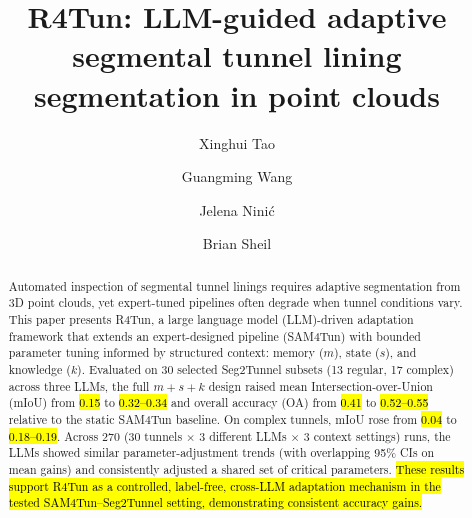 \documentclass[a4paper,fleqn]{cas-dc}
\begin{document}
\let\WriteBookmarks\relax
\def\floatpagepagefraction{1}
\def\textpagefraction{.001}




{

\title[mode=title]{R4Tun: LLM-guided adaptive segmental tunnel lining segmentation in point clouds}

\author[1]{Xinghui Tao}

\author[1]{Guangming Wang}
\cormark[1]

\author[2]{Jelena Nini\'{c}}

\author[1]{Brian Sheil}






\begin{abstract}
Automated inspection of segmental tunnel linings requires adaptive segmentation from 3D point clouds, yet expert-tuned pipelines often degrade when tunnel conditions vary. This paper presents R4Tun, a large language model (LLM)-driven adaptation framework that extends an expert-designed pipeline (SAM4Tun) with bounded parameter tuning informed by structured context: memory ($m$), state ($s$), and knowledge ($k$). Evaluated on 30 selected Seg2Tunnel subsets (13 regular, 17 complex) across three LLMs, the full $m+s+k$ design raised mean Intersection-over-Union (mIoU) from \hl{0.15} to \hl{0.32--0.34} and overall accuracy (OA) from \hl{0.41} to \hl{0.52--0.55} relative to the static SAM4Tun baseline. On complex tunnels, mIoU rose from \hl{0.04} to \hl{0.18--0.19}. Across 270 (30 tunnels $\times$ 3 different LLMs $\times$ 3 context settings) runs, the LLMs showed similar parameter-adjustment trends (with overlapping 95\% CIs on mean gains) and consistently adjusted a shared set of critical parameters. \hl{These results support R4Tun as a controlled, label-free, cross-LLM adaptation mechanism in the tested SAM4Tun--Seg2Tunnel setting, demonstrating consistent accuracy gains.}
\end{abstract}


}
\end{document}
